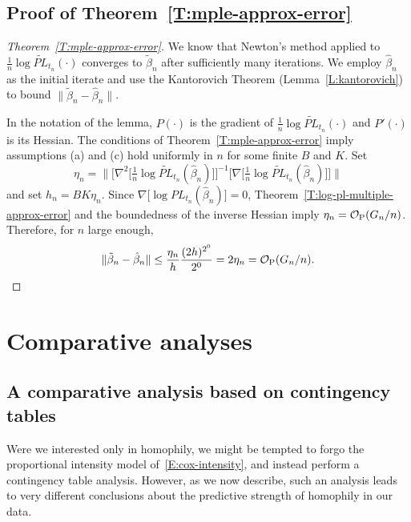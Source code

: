 \documentclass[final]{statsoc}
\newcommand{\qedhere}{}
\begin{document}
\subsection{Proof of Theorem~\ref{T:mple-approx-error}}

\begin{proof}[Theorem~\ref{T:mple-approx-error}]

We know that Newton's method applied to
$\tfrac{1}{n}\log \widetilde{\mathit{PL}}_{t_n}(\cdot)$ converges to
$\tilde \beta_n$ after sufficiently many iterations.  We employ $\hat \beta_n$ as the
initial iterate and use the Kantorovich Theorem (Lemma~\ref{L:kantorovich})
to bound $\|\tilde \beta_n - \hat \beta_n\|$.

In the notation of the lemma, $P(\cdot)$ is the gradient of
$\tfrac{1}{n} \log \widetilde{\mathit{PL}}_{t_n}(\cdot)$ and
$P'(\cdot)$ is its Hessian.
The conditions of Theorem~\ref{T:mple-approx-error} imply assumptions
(a) and (c) hold uniformly in $n$ for some finite $B$ and $K$.
Set
\[
    \eta_n =
    \Big\|
        \Big[
            \nabla^2\big[
                \tfrac{1}{n}
                \log \widetilde{\mathit{PL}}_{t_n}(\hat \beta_{n})
            \big]
        \Big]^{-1}
        \Big[
            \nabla\big[
                \tfrac{1}{n}
                \log \widetilde{\mathit{PL}}_{t_n}(\hat \beta_{n})
            \big]
        \Big]
    \Big\|
\]
and set $h_n = B K \eta_n$.
Since $\nabla\big[\log {\mathit{PL}}_{t_n}(\hat \beta_{n})\big] = 0$,
Theorem~\ref{T:log-pl-multiple-approx-error} and the boundedness of the
inverse Hessian imply $\eta_n = \mathcal{O}_\text{P}(G_n/n)$.  Therefore, for $n$
large enough,
\[
    \| \tilde \beta_n - \hat \beta_n \|
        \leq \frac{\eta_n}{h}\frac{(2h)^{2^0}}{2^0}
        = 2 \eta_n
        = \OhP(G_n/n).
    \qedhere
\]
\end{proof}

\section{Comparative analyses}\label{S:comparative}

\subsection{A comparative analysis based on contingency tables}
\label{sec:contin-analysis}

Were we interested only in homophily, we might be tempted to forgo
the proportional intensity model of~\eqref{E:cox-intensity}, and instead
perform a contingency table analysis.  However, as we now describe,
such an analysis leads to very different conclusions
about the predictive strength of homophily in our data.
\end{document}
